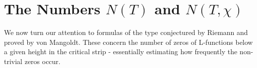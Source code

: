 \section{The Numbers $N(T)$ and $N(T, \chi)$}
We now turn our attention to formulas of the type conjectured by Riemann and proved by von Mangoldt. These concern the number of zeros of L-functions below a given height in the critical strip - essentially estimating how frequently the non-trivial zeros occur. 